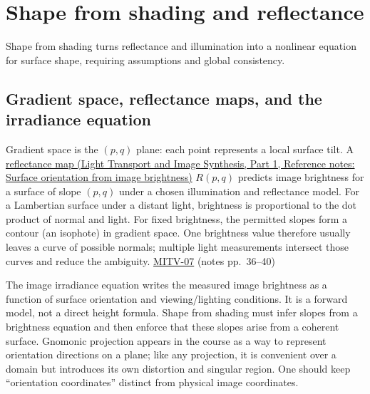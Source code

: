 \section{Shape from shading and reflectance}\label{04-visual-computing-ii-ch032-shape-from-shading-and-reflectance}

\hypertarget{04-visual-computing-ii-ch032-shape-from-shading-and-reflectance}{}

Shape from shading turns reflectance and illumination into a nonlinear equation for surface shape, requiring assumptions and global consistency.

\subsection{Gradient space, reflectance maps, and the irradiance equation}\label{04-visual-computing-ii-ch032-gradient-space-reflectance-maps-and-the-irradiance-equation}

\hypertarget{04-visual-computing-ii-ch032-gradient-space-reflectance-maps-and-the-irradiance-equation}{}

Gradient space is the \((p,q)\) plane: each point represents a local surface tilt. A \href{../04-Light-Transport-and-Image-Synthesis-P01/main.pdf\#nameddest=appendix-89b2d5b7c9e1}{reflectance map (Light Transport and Image Synthesis, Part 1, Reference notes: Surface orientation from image brightness)} \(R(p,q)\) predicts image brightness for a surface of slope \((p,q)\) under a chosen illumination and reflectance model. For a Lambertian surface under a distant light, brightness is proportional to the dot product of normal and light. For fixed brightness, the permitted slopes form a contour (an isophote) in gradient space. One brightness value therefore usually leaves a curve of possible normals; multiple light measurements intersect those curves and reduce the ambiguity. \hyperref[04-visual-computing-ii-ch036-mitv-07---gradient-space-reflectance-map-image-irradiance-equation-gnomonic-projection]{MITV-07} (notes pp.~36--40)

The image irradiance equation writes the measured image brightness as a function of surface orientation and viewing/lighting conditions. It is a forward model, not a direct height formula. Shape from shading must infer slopes from a brightness equation and then enforce that these slopes arise from a coherent surface. Gnomonic projection appears in the course as a way to represent orientation directions on a plane; like any projection, it is convenient over a domain but introduces its own distortion and singular region. One should keep ``orientation coordinates'' distinct from physical image coordinates.


